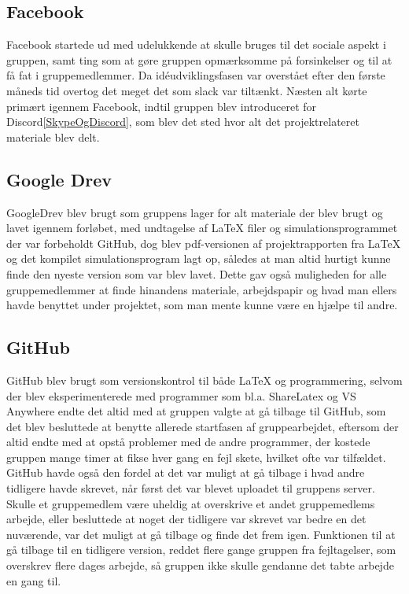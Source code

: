 \subsection{Facebook}\label{Facebook}
Facebook startede ud med udelukkende at skulle bruges til det sociale aspekt i gruppen, samt ting som at gøre gruppen opmærksomme på forsinkelser og til at få fat i gruppemedlemmer. Da idéudviklingsfasen var overstået efter den første måneds tid overtog det meget det som slack var tiltænkt. Næsten alt kørte primært igennem Facebook, indtil gruppen blev introduceret for Discord\ref{SkypeOgDiscord}, som blev det sted hvor alt det projektrelateret materiale blev delt.      

\subsection{Google Drev}\label{GoogleDrev}
GoogleDrev blev brugt som gruppens lager for alt materiale der blev brugt og lavet igennem forløbet, med undtagelse af LaTeX filer og simulationsprogrammet der var forbeholdt GitHub, dog blev pdf-versionen af projektrapporten fra LaTeX og det kompilet simulationsprogram lagt op, således at man altid hurtigt kunne finde den nyeste version som var blev lavet. Dette gav også muligheden for alle gruppemedlemmer at finde hinandens materiale, arbejdspapir og hvad man ellers havde benyttet under projektet, som man mente kunne være en hjælpe til andre.

\subsection{GitHub}\label{GitHub}
GitHub blev brugt som versionskontrol til både LaTeX og programmering, selvom der blev eksperimenterede med programmer som bl.a. ShareLatex og VS Anywhere endte det altid med at gruppen valgte at gå tilbage til GitHub, som det blev besluttede at benytte allerede startfasen af gruppearbejdet, eftersom der altid endte med at opstå problemer med de andre programmer, der kostede gruppen mange timer at fikse hver gang en fejl skete, hvilket ofte var tilfældet. GitHub havde også den fordel at det var muligt at gå tilbage i hvad andre tidligere havde skrevet, når først det var blevet uploadet til gruppens server. Skulle et gruppemedlem være uheldig at overskrive et andet gruppemedlems arbejde, eller besluttede at noget der tidligere var skrevet var bedre en det nuværende, var det muligt at gå tilbage og finde det frem igen. Funktionen til at gå tilbage til en tidligere version, reddet flere gange gruppen fra fejltagelser, som overskrev flere dages arbejde, så gruppen ikke skulle gendanne det tabte arbejde en gang til. 

